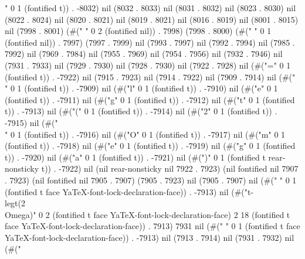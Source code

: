 " 0 1 (fontified t)) . -8032) nil (8032 . 8033) nil (8031 . 8032) nil (8023 . 8030) nil (8022 . 8024) nil (8020 . 8021) nil (8019 . 8021) nil (8016 . 8019) nil (8001 . 8015) nil (7998 . 8001) (#("  " 0 2 (fontified nil)) . 7998) (7998 . 8000) (#(" " 0 1 (fontified nil)) . 7997) (7997 . 7999) nil (7993 . 7997) nil (7992 . 7994) nil (7985 . 7992) nil (7969 . 7984) nil (7955 . 7969) nil (7954 . 7956) nil (7932 . 7946) nil (7931 . 7933) nil (7929 . 7930) nil (7928 . 7930) nil (7922 . 7928) nil (#("=" 0 1 (fontified t)) . -7922) nil (7915 . 7923) nil (7914 . 7922) nil (7909 . 7914) nil (#("\\" 0 1 (fontified t)) . -7909) nil (#("l" 0 1 (fontified t)) . -7910) nil (#("e" 0 1 (fontified t)) . -7911) nil (#("g" 0 1 (fontified t)) . -7912) nil (#("t" 0 1 (fontified t)) . -7913) nil (#("(" 0 1 (fontified t)) . -7914) nil (#("2" 0 1 (fontified t)) . -7915) nil (#("\\" 0 1 (fontified t)) . -7916) nil (#("O" 0 1 (fontified t)) . -7917) nil (#("m" 0 1 (fontified t)) . -7918) nil (#("e" 0 1 (fontified t)) . -7919) nil (#("g" 0 1 (fontified t)) . -7920) nil (#("a" 0 1 (fontified t)) . -7921) nil (#(")" 0 1 (fontified t rear-nonsticky t)) . -7922) nil (nil rear-nonsticky nil 7922 . 7923) (nil fontified nil 7907 . 7923) (nil fontified nil 7905 . 7907) (7905 . 7923) nil (7905 . 7907) nil (#(" " 0 1 (fontified t face YaTeX-font-lock-declaration-face)) . -7913) nil (#("{t}-\\legt(2\\Omega)" 0 2 (fontified t face YaTeX-font-lock-declaration-face) 2 18 (fontified t face YaTeX-font-lock-declaration-face)) . 7913) 7931 nil (#(" " 0 1 (fontified t face YaTeX-font-lock-declaration-face)) . -7913) nil (7913 . 7914) nil (7931 . 7932) nil (#("
